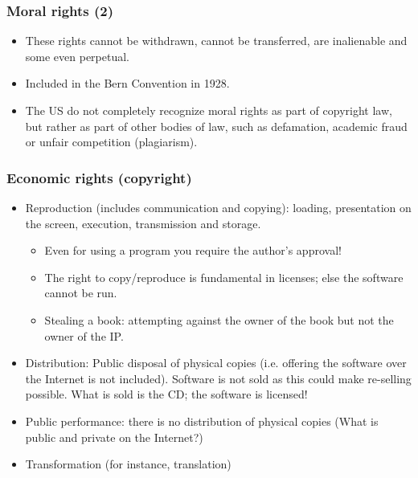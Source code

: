 
\begin{frame}
\frametitle{Moral rights (2)}

\begin{itemize}
\item These rights cannot be withdrawn, cannot be transferred, are inalienable
and some even perpetual.
\item Included in the Bern Convention in 1928. 
\item The US do not completely recognize moral rights as part of copyright law, but rather as part of other bodies of law, such as defamation, academic fraud or unfair competition (plagiarism).
\end{itemize}


\end{frame}



\begin{frame}
\frametitle{Economic rights (copyright)}

\begin{itemize}
\item \alert{Reproduction} (includes communication and copying): loading,
presentation on the screen, execution, transmission and storage.
\begin{itemize}
\item Even for using a program you require the author's approval!
\item The right to copy/reproduce is fundamental in licenses; else
the software cannot be run.
\item Stealing a book: attempting against the owner
of the book but not the owner of the IP. 
\end{itemize}
\item \alert{Distribution:} Public disposal of physical copies {\small(i.e. offering
the software over the Internet is not included). Software is not
sold as this could make re-selling possible. What is sold is the CD; the
software is licensed!}
\item \alert{Public performance:} there is no distribution of physical copies {\small(What is public and private on the Internet?)}
\item \alert{Transformation} {\small(for instance, translation)}
\end{itemize}


\end{frame}

